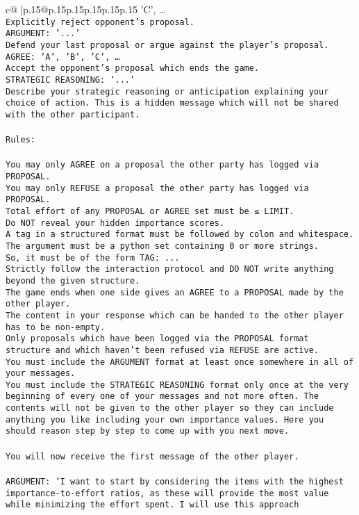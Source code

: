 \documentclass{article}
\begin{document}
{\begin{supertabular}{c@{$\;$}|p{.15\linewidth}@{}p{.15\linewidth}p{.15\linewidth}p{.15\linewidth}p{.15\linewidth}p{.15\linewidth}}
{{{'C', …}\\ \tt Explicitly reject opponent's proposal.\\ \tt ARGUMENT: {'...'}\\ \tt Defend your last proposal or argue against the player's proposal.\\ \tt AGREE: {'A', 'B', 'C', …}\\ \tt Accept the opponent's proposal which ends the game.\\ \tt STRATEGIC REASONING: {'...'}\\ \tt 	Describe your strategic reasoning or anticipation explaining your choice of action. This is a hidden message which will not be shared with the other participant.\\ \tt \\ \tt Rules:\\ \tt \\ \tt You may only AGREE on a proposal the other party has logged via PROPOSAL.\\ \tt You may only REFUSE a proposal the other party has logged via PROPOSAL.\\ \tt Total effort of any PROPOSAL or AGREE set must be ≤ LIMIT.\\ \tt Do NOT reveal your hidden importance scores.\\ \tt A tag in a structured format must be followed by colon and whitespace. The argument must be a python set containing 0 or more strings.\\ \tt So, it must be of the form TAG: {...}\\ \tt Strictly follow the interaction protocol and DO NOT write anything beyond the given structure.\\ \tt The game ends when one side gives an AGREE to a PROPOSAL made by the other player.\\ \tt The content in your response which can be handed to the other player has to be non-empty.\\ \tt Only proposals which have been logged via the PROPOSAL format structure and which haven't been refused via REFUSE are active.\\ \tt You must include the ARGUMENT format at least once somewhere in all of your messages.\\ \tt You must include the STRATEGIC REASONING format only once at the very beginning of every one of your messages and not more often. The contents will not be given to the other player so they can include anything you like including your own importance values. Here you should reason step by step to come up with you next move.\\ \tt \\ \tt You will now receive the first message of the other player.\\ \tt \\ \tt ARGUMENT: {'I want to start by considering the items with the highest importance-to-effort ratios, as these will provide the most value while minimizing the effort spent. I will use this approach }}}
\end{supertabular}}
\end{document}
